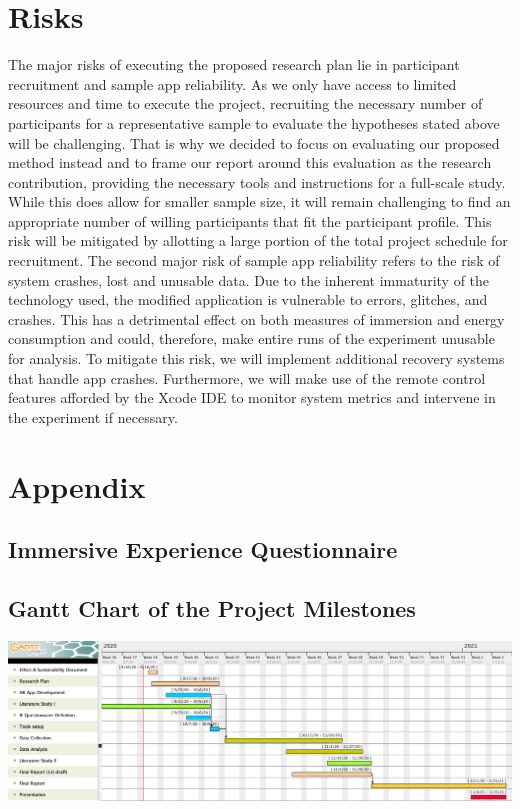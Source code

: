 \documentclass[12pt,twoside,english]{article}
\begin{document}
\section{Risks}
\label{sect:risks}
The major risks of executing the proposed research plan lie in participant recruitment and sample app reliability.
As we only have access to limited resources and time to execute the project, recruiting the necessary number of participants for a representative sample to evaluate the hypotheses stated above will be challenging.
That is why we decided to focus on evaluating our proposed method instead and to frame our report around this evaluation as the research contribution, providing the necessary tools and instructions for a full-scale study.
While this does allow for smaller sample size, it will remain challenging to find an appropriate number of willing participants that fit the participant profile.
This risk will be mitigated by allotting a large portion of the total project schedule for recruitment.
The second major risk of sample app reliability refers to the risk of system crashes, lost and unusable data.
Due to the inherent immaturity of the technology used, the modified application is vulnerable to errors, glitches, and crashes.
This has a detrimental effect on both measures of immersion and energy consumption and could, therefore, make entire runs of the experiment unusable for analysis. 
To mitigate this risk, we will implement additional recovery systems that handle app crashes.
Furthermore, we will make use of the remote control features afforded by the Xcode \gls{IDE} to monitor system metrics and intervene in the experiment if necessary.



% 


\appendix
\section{Appendix}
\label{sect:appendix}

\subsection{Immersive Experience Questionnaire}
\label{sect:ieq}


\subsection{Gantt Chart of the Project Milestones}
\label{sect:gantt_chart}

\includegraphics[width=\textwidth]{imgs/project_milestones}

\printglossary[type=\acronymtype, nonumberlist]
\clearpage
\end{document}
